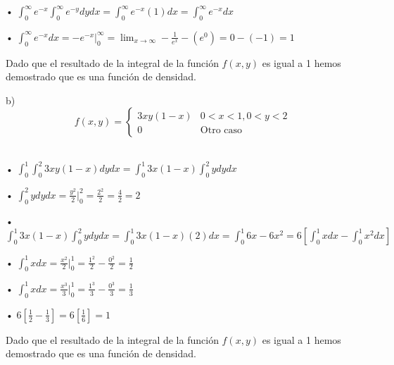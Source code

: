\documentclass[a4paper, 12pt]{article}
\newcommand{\Aspace}{0.2cm}
\begin{document}
\begin{enumerate}
{                • \(
                    \int_{0}^{\infty} e^{-x} \int_{0}^{\infty} e^{-y}dydx
                    = \int_{0}^{\infty} e^{-x}(1)dx
                    = \int_{0}^{\infty} e^{-x}dx
                \)

                • \(
                    \int_{0}^{\infty} e^{-x}dx
                    = -e^{-x} \Big|_{0}^{\infty}
                    = \lim_{x \rightarrow \infty} -\frac{1}{e^{x}} - (e^{0})
                    = 0 - (-1)
                    = 1
                \)

                Dado que el resultado de la integral de la función $f(x, y)$ es igual a 1 hemos demostrado que es una función de densidad.
            }

            \par b)
            \[
                f(x, y) =
                \begin{cases}
                    3xy(1 - x)      &   0 < x < 1, 0 < y < 2    \\
                    0               &   \text{Otro caso}
                \end{cases}
            \]
            \vspace{\Aspace}
            { \color{azul} 
                \\ • \(
                    \int_{0}^{1} \int_{0}^{2} 3xy(1 - x)dydx
                    = \int_{0}^{1} 3x(1 - x) \int_{0}^{2} ydydx
                \)

                • \(
                    \int_{0}^{2} ydydx
                    = \frac{y^{2}}{2} \Big|_{0}^{2} 
                    = \frac{2^{2}}{2}
                    = \frac{4}{2}
                    = 2
                \)

                • \(
                    \int_{0}^{1} 3x(1 - x) \int_{0}^{2}ydydx
                    = \int_{0}^{1} 3x(1 - x)(2)dx
                    = \int_{0}^{1} 6x-6x^{2}
                    = 6 \left[ \int_{0}^{1}xdx - \int_{0}^{1}x^{2}dx \right]
                \)

                • \(
                    \int_{0}^{1}xdx
                    = \frac{x^{2}}{2} \Big|_{0}^{1}
                    = \frac{1^{2}}{2} - \frac{0^{2}}{2} 
                    = \frac{1}{2}
                \)

                • \(
                    \int_{0}^{1}xdx
                    = \frac{x^{3}}{3} \Big|_{0}^{1}
                    = \frac{1^{3}}{3} - \frac{0^{3}}{3} 
                    = \frac{1}{3}
                \)

                • \(
                    6 \left[ \frac{1}{2} - \frac{1}{3} \right]
                    = 6 \left[ \frac{1}{6} \right]
                    = 1
                \)

                Dado que el resultado de la integral de la función $f(x, y)$ es igual a 1 hemos demostrado que es una función de densidad.

            }
    \end{enumerate}
\end{document}
